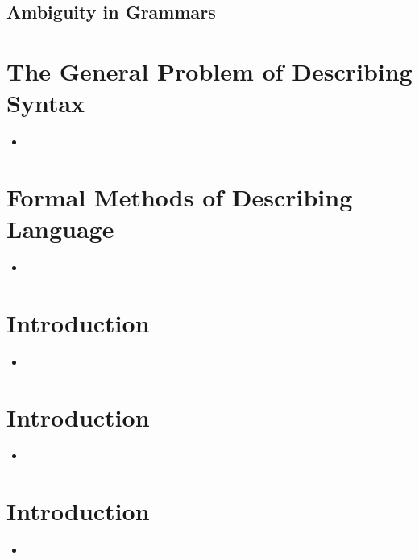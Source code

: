 \documentclass[12pt]{article}
\begin{document}
\subsection{Ambiguity in Grammars}



\section{The General Problem of Describing Syntax}

\begin{itemize}
  \item 
\end{itemize}


\section{Formal Methods of Describing Language}

\begin{itemize}
  \item 
\end{itemize}


\section{Introduction}

\begin{itemize}
  \item 
\end{itemize}


\section{Introduction}

\begin{itemize}
  \item 
\end{itemize}


\section{Introduction}

\begin{itemize}
  \item 
\end{itemize}
\end{document}
